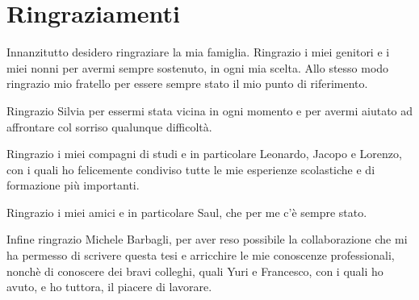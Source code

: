 \chapter*{Ringraziamenti}

Innanzitutto desidero ringraziare la mia famiglia. Ringrazio i miei genitori e i miei nonni per avermi sempre sostenuto, in ogni mia scelta. Allo stesso modo ringrazio mio fratello per essere sempre stato il mio punto di riferimento.\par
Ringrazio Silvia per essermi stata vicina in ogni momento e per avermi aiutato ad affrontare col sorriso qualunque difficolt\`a.\par
Ringrazio i miei compagni di studi e in particolare Leonardo, Jacopo e Lorenzo, con i quali ho felicemente condiviso tutte le mie esperienze scolastiche e di formazione pi\`u importanti.\par
Ringrazio i miei amici e in particolare Saul, che per me c'\`e sempre stato.\par
Infine ringrazio Michele Barbagli, per aver reso possibile la collaborazione che mi ha permesso di scrivere questa tesi e arricchire le mie conoscenze professionali, nonch\`e di conoscere dei bravi colleghi, quali Yuri e Francesco, con i quali ho avuto, e ho tuttora, il piacere di lavorare.
